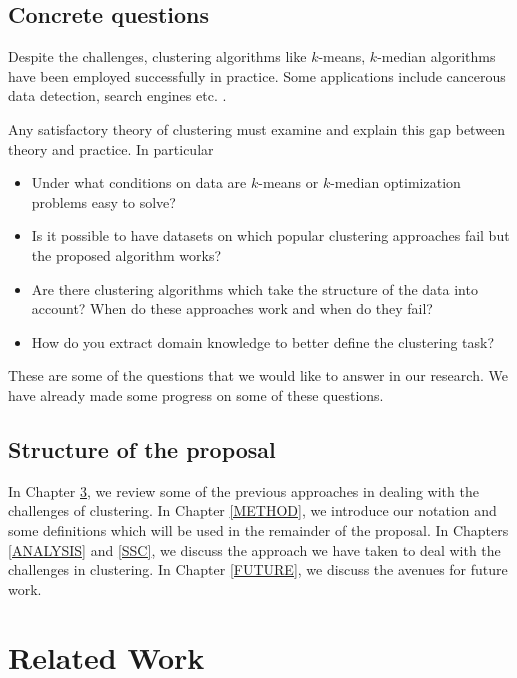 \documentclass[letterpaper,12pt,titlepage,oneside,final]{book}
\begin{document}
\section{Concrete questions}
Despite the challenges, clustering algorithms like $k$-means, $k$-median algorithms have been employed successfully in practice. Some applications include cancerous data detection, search engines etc. \cite{wang2005comparison,liu2007clustering}. 

Any satisfactory theory of clustering must examine and explain this gap between theory and practice. In particular

\begin{itemize}
	\item Under what conditions on data are $k$-means or $k$-median optimization problems easy to solve?
	\item Is it possible to have datasets on which popular clustering approaches fail but the proposed algorithm works?
	\item Are there clustering algorithms which take the structure of the data into account? When do these approaches work and when do they fail?
	\item How do you extract domain knowledge to better define the clustering task?
\end{itemize}

These are some of the questions that we would like to answer in our research. We have already made some progress on some of these questions. 

\section{Structure of the proposal}
In Chapter \ref{RLW}, we review some of the previous approaches in dealing with the challenges of clustering. In Chapter \ref{METHOD}, we introduce our notation and some definitions which will be used in the remainder of the proposal. In Chapters \ref{ANALYSIS} and \ref{SSC}, we discuss the approach we have taken to deal with the challenges in clustering. In Chapter \ref{FUTURE}, we discuss the avenues for future work. 








\chapter{Related Work}
\label{RLW}
\end{document}
